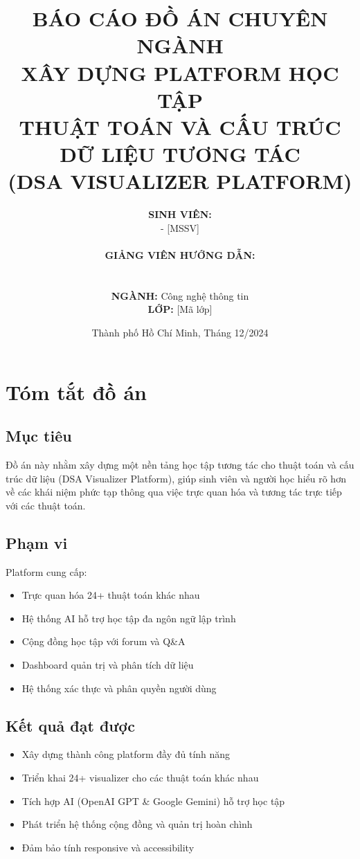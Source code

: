 \documentclass[12pt,a4paper]{article}
\title{\Huge\textbf{BÁO CÁO ĐỒ ÁN CHUYÊN NGÀNH}\\
\vspace{1cm}
\LARGE XÂY DỰNG PLATFORM HỌC TẬP\\
THUẬT TOÁN VÀ CẤU TRÚC DỮ LIỆU TƯƠNG TÁC\\
\vspace{0.5cm}
\large (DSA VISUALIZER PLATFORM)}
\author{
\textbf{SINH VIÊN:}\\
[Tên sinh viên] - [MSSV]\\
\vspace{0.5cm}\\
\textbf{GIẢNG VIÊN HƯỚNG DẪN:}\\
[Tên giảng viên]\\
\vspace{0.5cm}\\
\textbf{NGÀNH:} Công nghệ thông tin\\
\textbf{LỚP:} [Mã lớp]
}
\date{Thành phố Hồ Chí Minh, Tháng 12/2024}
\begin{document}
\maketitle
\newpage

\tableofcontents
\newpage

\section{Tóm tắt đồ án}

\subsection{Mục tiêu}
Đồ án này nhằm xây dựng một nền tảng học tập tương tác cho thuật toán và cấu trúc dữ liệu (DSA Visualizer Platform), giúp sinh viên và người học hiểu rõ hơn về các khái niệm phức tạp thông qua việc trực quan hóa và tương tác trực tiếp với các thuật toán.

\subsection{Phạm vi}
Platform cung cấp:
\begin{itemize}
    \item Trực quan hóa 24+ thuật toán khác nhau
    \item Hệ thống AI hỗ trợ học tập đa ngôn ngữ lập trình
    \item Cộng đồng học tập với forum và Q\&A
    \item Dashboard quản trị và phân tích dữ liệu
    \item Hệ thống xác thực và phân quyền người dùng
\end{itemize}

\subsection{Kết quả đạt được}
\begin{itemize}
    \item Xây dựng thành công platform đầy đủ tính năng
    \item Triển khai 24+ visualizer cho các thuật toán khác nhau
    \item Tích hợp AI (OpenAI GPT \& Google Gemini) hỗ trợ học tập
    \item Phát triển hệ thống cộng đồng và quản trị hoàn chình
    \item Đảm bảo tính responsive và accessibility
\end{itemize}
\end{document}
